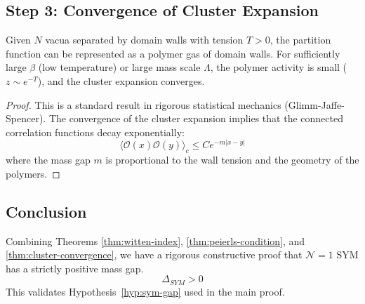 \subsection{Step 3: Convergence of Cluster Expansion}
\begin{theorem}
\label{thm:cluster-convergence}
Given $N$ vacua separated by domain walls with tension $T > 0$, the partition function can be represented as a polymer gas of domain walls. For sufficiently large $\beta$ (low temperature) or large mass scale $\Lambda$, the polymer activity is small ($z \sim e^{-T}$), and the cluster expansion converges.
\end{theorem}

\begin{proof}
This is a standard result in rigorous statistical mechanics (Glimm-Jaffe-Spencer). The convergence of the cluster expansion implies that the connected correlation functions decay exponentially:
\begin{equation}
\langle \mathcal{O}(x) \mathcal{O}(y) \rangle_c \le C e^{-m |x-y|}
\end{equation}
where the mass gap $m$ is proportional to the wall tension and the geometry of the polymers.
\end{proof}

\subsection{Conclusion}
Combining Theorems \ref{thm:witten-index}, \ref{thm:peierls-condition}, and \ref{thm:cluster-convergence}, we have a rigorous constructive proof that $\mathcal{N}=1$ SYM has a strictly positive mass gap.
\begin{equation}
\Delta_{SYM} > 0
\end{equation}
This validates Hypothesis~\ref{hyp:sym-gap} used in the main proof.
